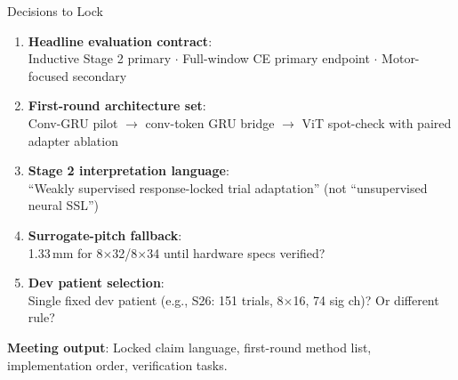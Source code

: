 \documentclass[aspectratio=169, 11pt]{beamer}
\begin{document}
\begin{frame}{Decisions to Lock}

\begin{enumerate}
\item \textbf{Headline evaluation contract}:\\
  {\small Inductive Stage 2 primary $\cdot$ Full-window CE primary endpoint $\cdot$ Motor-focused secondary}

\vspace{0.3em}
\item \textbf{First-round architecture set}:\\
  {\small Conv-GRU pilot $\to$ conv-token GRU bridge $\to$ ViT spot-check with paired adapter ablation}

\vspace{0.3em}
\item \textbf{Stage 2 interpretation language}:\\
  {\small ``Weakly supervised response-locked trial adaptation'' (not ``unsupervised neural SSL'')}

\vspace{0.3em}
\item \textbf{Surrogate-pitch fallback}:\\
  {\small 1.33\,mm for 8$\times$32/8$\times$34 until hardware specs verified?}

\vspace{0.3em}
\item \textbf{Dev patient selection}:\\
  {\small Single fixed dev patient (e.g., S26: 151 trials, 8$\times$16, 74 sig ch)? Or different rule?}
\end{enumerate}

\vspace{0.5em}
\textbf{Meeting output}: Locked claim language, first-round method list, implementation order, verification tasks.
\end{frame}

\end{document}
